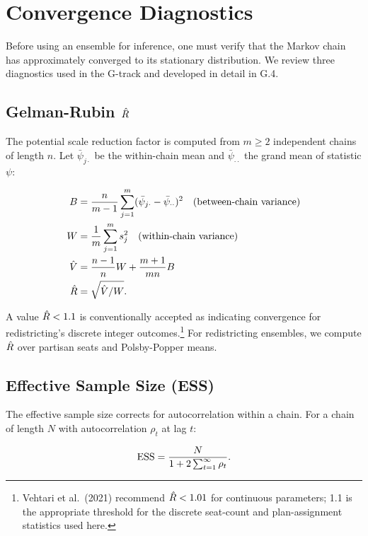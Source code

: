 \section{Convergence Diagnostics}
\label{sec:convergence}

Before using an ensemble for inference, one must verify that the Markov chain
has approximately converged to its stationary distribution.  We review three
diagnostics used in the G-track and developed in detail in G.4.

\subsection{Gelman-Rubin \texorpdfstring{$\hat{R}$}{R-hat}}

The \citet{gelman1992inference} potential scale reduction factor is computed
from $m \geq 2$ independent chains of length $n$.  Let $\bar{\psi}_{j\cdot}$
be the within-chain mean and $\bar{\psi}_{\cdot\cdot}$ the grand mean of
statistic $\psi$:

\begin{align}
  B &= \frac{n}{m-1} \sum_{j=1}^{m}(\bar{\psi}_{j\cdot} - \bar{\psi}_{\cdot\cdot})^2
      \quad \text{(between-chain variance)} \\
  W &= \frac{1}{m}\sum_{j=1}^{m} s_j^2
      \quad \text{(within-chain variance)} \\
  \hat{V} &= \frac{n-1}{n} W + \frac{m+1}{mn} B \\
  \hat{R} &= \sqrt{\hat{V}/W}.
\end{align}

A value $\hat{R} < 1.1$ is conventionally accepted as indicating convergence
for redistricting's discrete integer outcomes.\footnote{Vehtari et al.\ (2021)
recommend $\hat{R} < 1.01$ for continuous parameters; 1.1 is the appropriate
threshold for the discrete seat-count and plan-assignment statistics used
here.}
For redistricting ensembles, we compute $\hat{R}$ over partisan seats and
Polsby-Popper means.

\subsection{Effective Sample Size (ESS)}

The effective sample size corrects for autocorrelation within a chain.  For
a chain of length $N$ with autocorrelation $\rho_t$ at lag $t$:

\begin{equation}
  \mathrm{ESS} = \frac{N}{1 + 2\sum_{t=1}^{\infty} \rho_t}.
  \label{eq:ess}
\end{equation}

